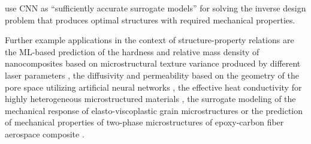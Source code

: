 \documentclass[11pt, authoryear]{elsarticle}
\renewcommand\textcolor[2]{#2}
\begin{document}
	\textcolor{red}{
		\citet{messner2020convolutional} use \gls{CNN} as ``sufficiently accurate surrogate models'' for solving the inverse design problem that produces optimal structures with required mechanical properties. 
	}
	Further example 
	applications in the context of structure-property relations are the ML-based 
	prediction of 
	the hardness and relative mass density of nanocomposites based on microstructural 
	texture variance produced by different laser parameters \citep{yu2021machine},  
	the diffusivity and permeability based on the geometry of the pore space 
	utilizing artificial neural networks \citep{prifling2021large}, 
	the effective heat conductivity for highly heterogeneous microstructured 
	materials \citep{lissner2019data}, 
	the surrogate modeling of the mechanical response of elasto-viscoplastic grain 
	microstructures \citep{khorrami2023artificial}
	or
	the prediction of mechanical properties of two-phase microstructures of 
	epoxy-carbon fiber aerospace composite \citep{ford2021machine}.
\end{document}
